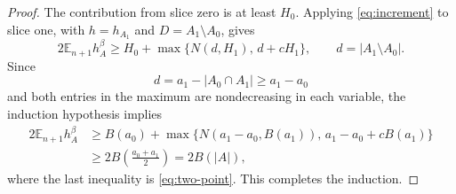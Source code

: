 \documentclass[11pt]{amsart}
\newcommand{\E}{\mathbb E}
\begin{document}
\begin{proof}
The contribution from slice zero is at least $H_0$. Applying
\eqref{eq:increment} to slice one, with $h=h_{A_1}$ and
$D=A_1\setminus A_0$, gives
\[
 2\E_{n+1}h_A^\beta
 \ge H_0+\max\{N(d,H_1),\,d+cH_1\},
 \qquad d=|A_1\setminus A_0|.
\]
Since
\[
 d=a_1-|A_0\cap A_1|\ge a_1-a_0
\]
and both entries in the maximum are nondecreasing in each variable,
the induction hypothesis implies
\begin{align*}
 2\E_{n+1}h_A^\beta
 &\ge B(a_0)+
 \max\{N(a_1-a_0,B(a_1)),\,a_1-a_0+cB(a_1)\}\\
 &\ge 2B\!\left(\frac{a_0+a_1}{2}\right)
 =2B(|A|),
\end{align*}
where the last inequality is \eqref{eq:two-point}. This completes
the induction.
\end{proof}
\end{document}
